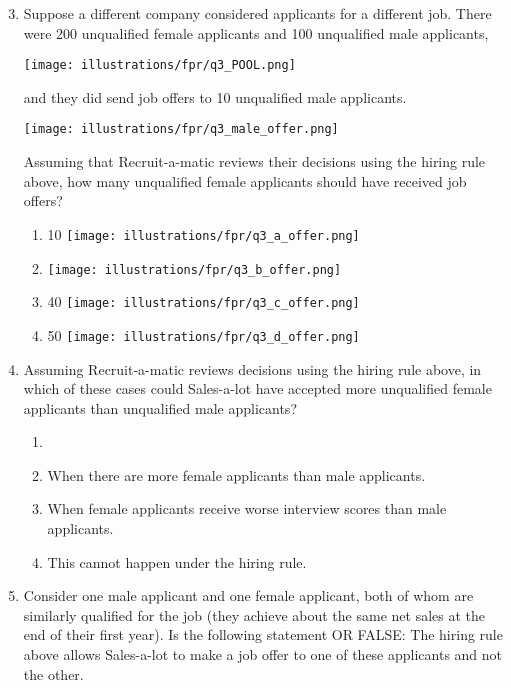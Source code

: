 \documentclass{article}
\newcommand{\correct}[1]{{\color{red}{#1}}}
\newcommand{\correct}[1]{{\color{red}{#1}}}
\begin{document}
\begin{enumerate}
\setcounter{enumi}{2}
    \item Suppose a different company considered applicants for a different job. There were 200 unqualified female applicants and 100 unqualified male applicants,

\texttt{[image: illustrations/fpr/q3\_POOL.png]}

and they did send job offers to 10 unqualified male applicants.

\texttt{[image: illustrations/fpr/q3\_male\_offer.png]}

Assuming that Recruit-a-matic reviews their decisions using the hiring rule above, how many unqualified female applicants should have received job offers?
\begin{enumerate}
    \item 10
    \texttt{[image: illustrations/fpr/q3\_a\_offer.png]}
    \item \correct{20}
    \texttt{[image: illustrations/fpr/q3\_b\_offer.png]}
    \item 40
    \texttt{[image: illustrations/fpr/q3\_c\_offer.png]}
    \item 50
    \texttt{[image: illustrations/fpr/q3\_d\_offer.png]}
\end{enumerate}

\item Assuming Recruit-a-matic reviews decisions using the hiring rule above, in which of these cases could Sales-a-lot have accepted more unqualified female applicants than unqualified male applicants?

\begin{enumerate}
    \item \correct{When there are more unqualified female applicants than unqualified male applicants (i.e., more women had low net sales at the end of the year).}
    \item When there are more female applicants than male applicants.
    \item When female applicants receive worse interview scores than male applicants.
    \item This cannot happen under the hiring rule.
\end{enumerate}

\item Consider one male applicant and one female applicant, both of whom are similarly qualified for the job (they achieve about the same net sales at the end of their first year). Is the following statement \correct{TRUE} OR FALSE: The hiring rule above allows Sales-a-lot to make a job offer to one of these applicants and not the other.


\end{enumerate}
\end{document}
